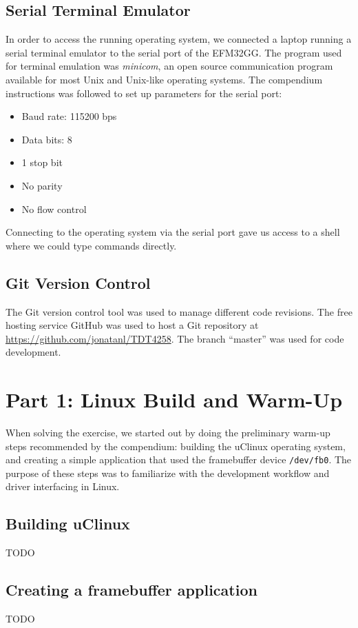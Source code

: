 \subsection{Serial Terminal Emulator}
In order to access the running operating system, we connected a laptop running a serial terminal emulator to the serial port of the EFM32GG. The program used for terminal emulation was \emph{minicom}, an open source communication program available for most Unix and Unix-like operating systems.\cite{minicom-man-page} The compendium instructions was followed to set up parameters for the serial port:
\begin{itemize}
  \item Baud rate: 115200 bps
  \item Data bits: 8
  \item 1 stop bit
  \item No parity
  \item No flow control
\end{itemize}
Connecting to the operating system via the serial port gave us access to a shell where we could type commands directly.

\subsection{Git Version Control}
The Git version control tool was used to manage different code revisions. The free hosting service GitHub was used to host a Git repository at \url{https://github.com/jonatanl/TDT4258}. The branch ``master'' was used for code development.


\section{Part 1: Linux Build and Warm-Up}
When solving the exercise, we started out by doing the preliminary warm-up steps recommended by the compendium: building the uClinux operating system, and creating a simple application that used the framebuffer device \texttt{/dev/fb0}. The purpose of these steps was to familiarize with the development workflow and driver interfacing in Linux.

\subsection{Building uClinux}
TODO %

\subsection{Creating a framebuffer application}
TODO %

